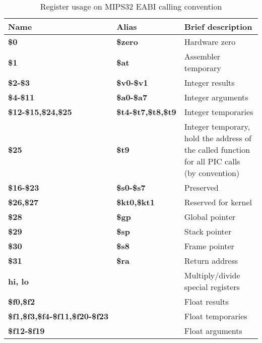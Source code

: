 \begin{table}[h]
\begin{tabular*}{0.95\textwidth}{lll}
Name                                   & Alias                     & Brief description\\
\hline                                                             
{\bf \$0}                              & {\bf \$zero}              & Hardware zero \\
{\bf \$1}                              & {\bf \$at}                & Assembler temporary \\
{\bf \$2-\$3}                          & {\bf \$v0-\$v1}           & Integer results \\
{\bf \$4-\$11}                         & {\bf \$a0-\$a7}           & Integer arguments\\
{\bf \$12-\$15,\$24,\$25}              & {\bf \$t4-\$t7,\$t8,\$t9} & Integer temporaries \\
{\bf \$25}                             & {\bf \$t9}                & Integer temporary, hold the address of the called function for all PIC calls (by convention) \\
{\bf \$16-\$23}                        & {\bf \$s0-\$s7}           & Preserved \\
{\bf \$26,\$27}                        & {\bf \$kt0,\$kt1}         & Reserved for kernel \\
{\bf \$28}                             & {\bf \$gp}                & Global pointer \\
{\bf \$29}                             & {\bf \$sp}                & Stack pointer \\
{\bf \$30}                             & {\bf \$s8}                & Frame pointer \\
{\bf \$31}                             & {\bf \$ra}                & Return address \\
{\bf hi, lo}                           &                           & Multiply/divide special registers \\
{\bf \$f0,\$f2}                        &                           & Float results \\
{\bf \$f1,\$f3,\$f4-\$f11,\$f20-\$f23} &                           & Float temporaries \\
{\bf \$f12-\$f19}                      &                           & Float arguments \\
\end{tabular*}
\caption{Register usage on MIPS32 EABI calling convention}
\end{table}

